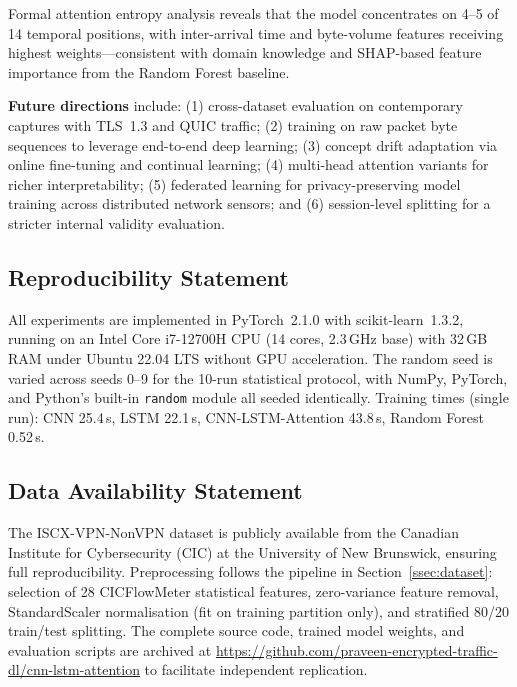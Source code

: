 \documentclass[conference]{IEEEtran}
\begin{document}
Formal attention entropy analysis reveals that the model concentrates on
4--5 of 14 temporal positions, with inter-arrival time and byte-volume features
receiving highest weights---consistent with domain knowledge and SHAP-based
feature importance from the Random Forest baseline.

\textbf{Future directions} include: (1) cross-dataset evaluation on contemporary
captures with TLS~1.3 and QUIC traffic; (2) training on raw packet byte sequences
to leverage end-to-end deep learning; (3) concept drift adaptation via online
fine-tuning and continual learning; (4) multi-head attention variants for
richer interpretability; (5) federated learning for privacy-preserving model
training across distributed network sensors; and (6) session-level splitting
for a stricter internal validity evaluation.

\subsection{Reproducibility Statement}

All experiments are implemented in PyTorch~2.1.0 with scikit-learn~1.3.2,
running on an Intel Core i7-12700H CPU (14 cores, 2.3\,GHz base) with
32\,GB RAM under Ubuntu 22.04 LTS without GPU acceleration. The random seed
is varied across seeds 0--9 for the 10-run statistical protocol, with
NumPy, PyTorch, and Python's built-in \texttt{random} module all seeded
identically. Training times (single run): CNN 25.4\,s, LSTM 22.1\,s,
CNN-LSTM-Attention 43.8\,s, Random Forest 0.52\,s.

\subsection{Data Availability Statement}

The ISCX-VPN-NonVPN dataset is publicly available from the Canadian Institute
for Cybersecurity (CIC) at the University of New Brunswick,
ensuring full reproducibility. Preprocessing follows the pipeline in
Section~\ref{ssec:dataset}: selection of 28 CICFlowMeter statistical features,
zero-variance feature removal, StandardScaler normalisation (fit on
training partition only), and stratified 80/20 train/test splitting. The
complete source code, trained model weights, and evaluation scripts are
archived at
\url{https://github.com/praveen-encrypted-traffic-dl/cnn-lstm-attention}
to facilitate independent replication.



\end{document}

